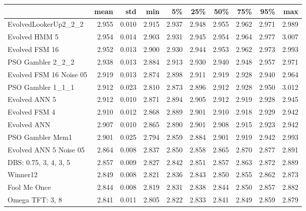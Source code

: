 \begin{tabular}{lrrrrrrrrr}
\toprule
{} &   mean &    std &    min &     5\% &    25\% &    50\% &    75\% &    95\% &    max \\
\midrule
EvolvedLookerUp2\_2\_2    &  2.955 &  0.010 &  2.915 &  2.937 &  2.948 &  2.955 &  2.962 &  2.971 &  2.989 \\
Evolved HMM 5           &  2.954 &  0.014 &  2.903 &  2.931 &  2.945 &  2.954 &  2.964 &  2.977 &  3.007 \\
Evolved FSM 16          &  2.952 &  0.013 &  2.900 &  2.930 &  2.944 &  2.953 &  2.962 &  2.973 &  2.993 \\
PSO Gambler 2\_2\_2       &  2.938 &  0.013 &  2.884 &  2.913 &  2.930 &  2.940 &  2.948 &  2.957 &  2.971 \\
Evolved FSM 16 Noise 05 &  2.919 &  0.013 &  2.874 &  2.898 &  2.911 &  2.919 &  2.928 &  2.940 &  2.964 \\
PSO Gambler 1\_1\_1       &  2.912 &  0.023 &  2.810 &  2.873 &  2.896 &  2.912 &  2.928 &  2.950 &  3.012 \\
Evolved ANN 5           &  2.912 &  0.010 &  2.871 &  2.894 &  2.905 &  2.912 &  2.919 &  2.928 &  2.945 \\
Evolved FSM 4           &  2.910 &  0.012 &  2.868 &  2.889 &  2.901 &  2.910 &  2.918 &  2.929 &  2.942 \\
Evolved ANN             &  2.907 &  0.010 &  2.865 &  2.890 &  2.901 &  2.908 &  2.915 &  2.923 &  2.942 \\
PSO Gambler Mem1        &  2.901 &  0.025 &  2.794 &  2.859 &  2.884 &  2.901 &  2.919 &  2.942 &  2.993 \\
Evolved ANN 5 Noise 05  &  2.864 &  0.008 &  2.837 &  2.850 &  2.858 &  2.865 &  2.870 &  2.877 &  2.891 \\
DBS: 0.75, 3, 4, 3, 5   &  2.857 &  0.009 &  2.827 &  2.842 &  2.851 &  2.857 &  2.863 &  2.872 &  2.889 \\
Winner12                &  2.849 &  0.008 &  2.821 &  2.836 &  2.843 &  2.850 &  2.855 &  2.862 &  2.873 \\
Fool Me Once            &  2.844 &  0.008 &  2.819 &  2.831 &  2.838 &  2.844 &  2.850 &  2.857 &  2.882 \\
Omega TFT: 3, 8         &  2.841 &  0.011 &  2.805 &  2.822 &  2.833 &  2.841 &  2.849 &  2.859 &  2.879 \\
\bottomrule
\end{tabular}

